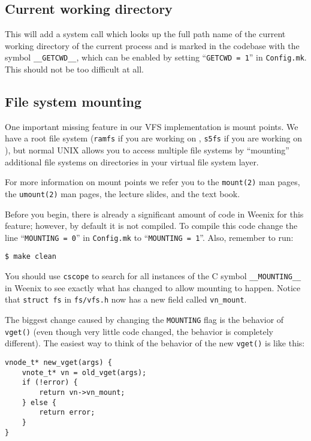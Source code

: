 \subsection{Current working directory}
This will add a system call which looks up the full path name of the current working directory of the current process and is marked in the codebase with the symbol \texttt{\_\_GETCWD\_\_}, which can be enabled by setting ``\texttt{GETCWD = 1}'' in \texttt{Config.mk}. This should not be too difficult at all.

\subsection{File system mounting}
One important missing feature in our VFS implementation is mount points. We have a root file system (\texttt{ramfs} if you are working on , \texttt{s5fs} if you are working on ), but normal UNIX allows you to access multiple file systems by ``mounting'' additional file systems on directories in your virtual file system layer.

For more information on mount points we refer you to the \texttt{mount(2)} man pages, the \texttt{umount(2)} man pages, the lecture slides, and the text book.

Before you begin, there is already a significant amount of code in Weenix for this feature; however, by default it is not compiled. To compile this code change the line ``\texttt{MOUNTING = 0}'' in \texttt{Config.mk} to ``\texttt{MOUNTING = 1}''. Also, remember to run:
\begin{verbatim}
$ make clean\end{verbatim}

You should use \texttt{cscope} to search for all instances of the C symbol \texttt{\_\_MOUNTING\_\_} in Weenix to see exactly what has changed to allow mounting to happen. Notice that \texttt{struct fs} in \texttt{fs/vfs.h} now has a new field called \texttt{vn\_mount}.

The biggest change caused by changing the \texttt{MOUNTING} flag is the behavior of \texttt{vget()} (even though very little code changed, the behavior is completely different). The easiest way to think of the behavior of the new \texttt{vget()} is like this:
\begin{verbatim}
vnode_t* new_vget(args) {
    vnote_t* vn = old_vget(args);
    if (!error) {
        return vn->vn_mount;
    } else {
        return error;
    }
}\end{verbatim}

